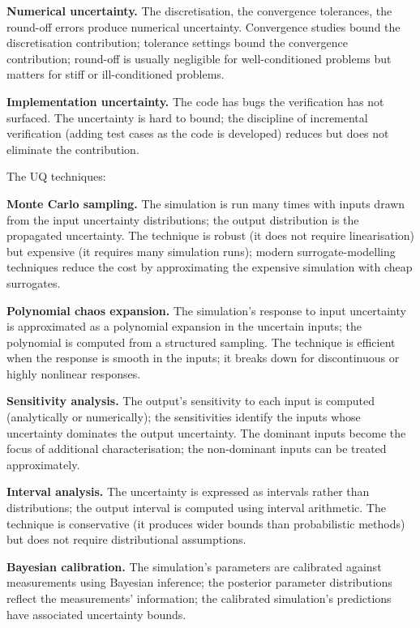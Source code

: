 \textbf{Numerical uncertainty.} The discretisation, the convergence tolerances, the round-off errors produce numerical uncertainty. Convergence studies bound the discretisation contribution; tolerance settings bound the convergence contribution; round-off is usually negligible for well-conditioned problems but matters for stiff or ill-conditioned problems.

\textbf{Implementation uncertainty.} The code has bugs the verification has not surfaced. The uncertainty is hard to bound; the discipline of incremental verification (adding test cases as the code is developed) reduces but does not eliminate the contribution.

The UQ techniques:

\textbf{Monte Carlo sampling.} The simulation is run many times with inputs drawn from the input uncertainty distributions; the output distribution is the propagated uncertainty. The technique is robust (it does not require linearisation) but expensive (it requires many simulation runs); modern surrogate-modelling techniques reduce the cost by approximating the expensive simulation with cheap surrogates.

\textbf{Polynomial chaos expansion.} The simulation's response to input uncertainty is approximated as a polynomial expansion in the uncertain inputs; the polynomial is computed from a structured sampling. The technique is efficient when the response is smooth in the inputs; it breaks down for discontinuous or highly nonlinear responses.

\textbf{Sensitivity analysis.} The output's sensitivity to each input is computed (analytically or numerically); the sensitivities identify the inputs whose uncertainty dominates the output uncertainty. The dominant inputs become the focus of additional characterisation; the non-dominant inputs can be treated approximately.

\textbf{Interval analysis.} The uncertainty is expressed as intervals rather than distributions; the output interval is computed using interval arithmetic. The technique is conservative (it produces wider bounds than probabilistic methods) but does not require distributional assumptions.

\textbf{Bayesian calibration.} The simulation's parameters are calibrated against measurements using Bayesian inference; the posterior parameter distributions reflect the measurements' information; the calibrated simulation's predictions have associated uncertainty bounds.

